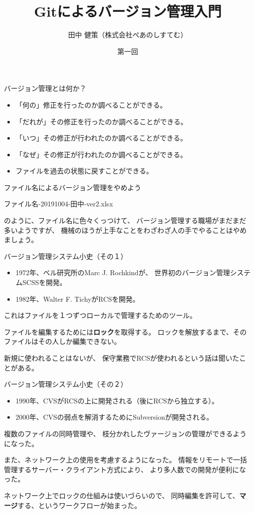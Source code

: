 \documentclass[12pt, unicode]{beamer}
\title{Gitによるバージョン管理入門}
\author{田中 健策（株式会社ぺあのしすてむ）}
\date[2019/10/04]{第一回}
\begin{document}
\frame{\maketitle}

\begin{frame}{バージョン管理とは何か？}
\begin{itemize}
\item 「何の」修正を行ったのか調べることができる。
\item 「だれが」その修正を行ったのか調べることができる。
\item 「いつ」その修正が行われたのか調べることができる。
\item 「なぜ」その修正が行われたのか調べることができる。
\item ファイルを過去の状態に戻すことができる。
\end{itemize}
\end{frame}
\begin{frame}{ファイル名によるバージョン管理をやめよう}

ファイル名-20191004-田中-ver2.xlsx

のように、ファイル名に色々くっつけて、
バージョン管理する職場がまだまだ多いようですが、
機械のほうが上手なことをわざわざ人の手でやることはやめましょう。

\end{frame}
\begin{frame}{バージョン管理システム小史（その１）}
\begin{itemize}
\item 1972年、ベル研究所のMarc J. Rochkindが、
世界初のバージョン管理システムSCSSを開発。
\item 1982年、Walter F. TichyがRCSを開発。
\end{itemize}

これはファイルを１つずつローカルで管理するためのツール。

ファイルを編集するためには\textbf{ロック}を取得する。
ロックを解放するまで、そのファイルはその人しか編集できない。

新規に使われることはないが、
保守業務でRCSが使われるという話は聞いたことがある。

\end{frame}
\begin{frame}{バージョン管理システム小史（その２）}
\begin{itemize}
\item 1990年、CVSがRCSの上に開発される（後にRCSから独立する）。
\item 2000年、CVSの弱点を解消するためにSubversionが開発される。
\end{itemize}

複数のファイルの同時管理や、
枝分かれしたヴァージョンの管理ができるようになった。

また、ネットワーク上の使用を考慮するようになった。
情報をリモートで一括管理するサーバー・クライアント方式により、
より多人数での開発が便利になった。

ネットワーク上でロックの仕組みは使いづらいので、
同時編集を許可して、\textbf{マージ}する、というワークフローが始まった。

\end{frame}
\end{document}
